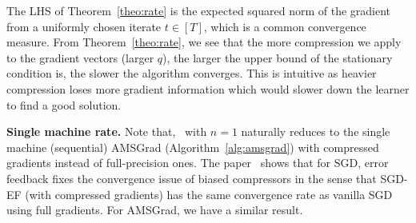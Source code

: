 \documentclass[11pt]{article}
\begin{document}
%

The LHS of Theorem~\ref{theo:rate} is the expected squared norm of the gradient from a uniformly chosen iterate $t\in [T]$, which is a common convergence measure. From Theorem~\ref{theo:rate}, we see that the more compression we apply to the gradient vectors (\ie larger $q$), the larger the upper bound of the stationary condition is, \ie the slower the algorithm converges. This is intuitive as heavier compression loses more gradient information which would slower down the learner to find a good solution.

\textbf{Single machine rate.} Note that, \algo\ with $n=1$ naturally reduces to the single machine (sequential) AMSGrad (Algorithm~\ref{alg:amsgrad}) with compressed gradients instead of full-precision ones. The paper~\cite{karimireddy2019error} shows that for SGD, error feedback fixes the convergence issue of biased compressors in the sense that SGD-EF (with compressed gradients) has the same convergence rate as vanilla SGD using full gradients. For AMSGrad, we have a similar result.
\end{document}
